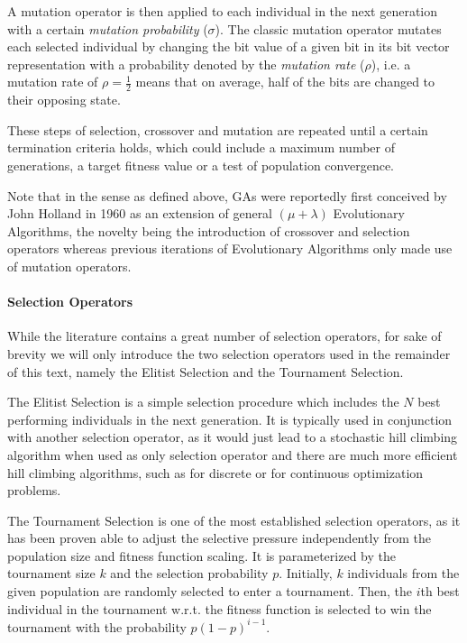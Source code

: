 A mutation operator is then applied to each individual in the next generation with a certain \emph{mutation probability} ($\sigma$).
The classic mutation operator mutates each selected individual by changing the bit value of a given bit in its bit vector representation with a probability denoted by the \emph{mutation rate} ($\rho$), i.e. a mutation rate of $\rho=\frac{1}{2}$ means that on average, half of the bits are changed to their opposing state.

These steps of selection, crossover and mutation are repeated until a certain termination criteria holds, which could include a maximum number of generations, a target fitness value or a test of population convergence.

Note that in the sense as defined above, \aclp{GA} were reportedly\cite{mitchell:1998a} first conceived by John Holland in 1960 as an extension of general $(\mu +\lambda)$ Evolutionary Algorithms, the novelty being the introduction of crossover and selection operators whereas previous iterations of Evolutionary Algorithms only made use of mutation operators.

\paragraph{Selection Operators}
While the literature contains a great number of selection operators, for sake of brevity we will only introduce the two selection operators used in the remainder of this text, namely the Elitist Selection\cite{mitchell:1998a} and the Tournament Selection\cite{miller:cs1995a}.


The Elitist Selection is a simple selection procedure which includes the $N$ best performing individuals in the next generation.
It is typically used in conjunction with another selection operator, as it would just lead to a stochastic hill climbing algorithm when used as only selection operator and there are much more efficient hill climbing algorithms, such as \cite{vaughan:ijc2005a} for discrete or \cite{altman:cm1970a} for continuous optimization problems.

The Tournament Selection is one of the most established selection operators, as it has been proven able to adjust the selective pressure independently from the population size and fitness function scaling\cite{goldberg:1990a}.
It is parameterized by the tournament size $k$ and the selection probability $p$.
Initially, $k$ individuals from the given population are randomly selected to enter a tournament.
Then, the $i$th best individual in the tournament w.r.t. the fitness function is selected to win the tournament with the probability $p(1-p)^{i-1}$.

